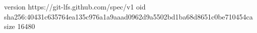version https://git-lfs.github.com/spec/v1
oid sha256:40431c635764ea135c976a1a9aaad0962d9a5502bd1ba68d8651c0be710454ca
size 16480

